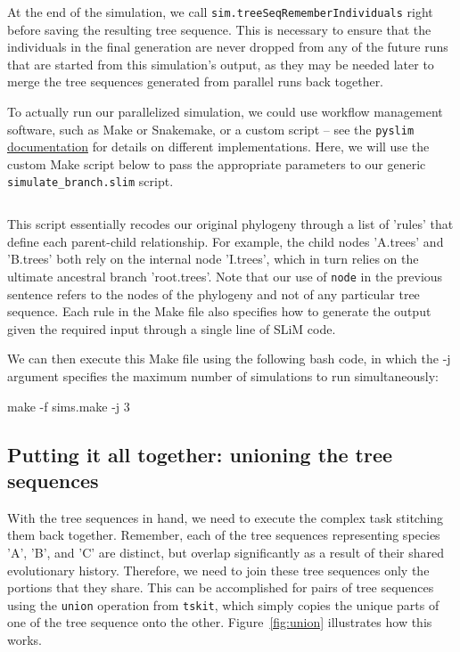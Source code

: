 \documentclass[12pt]{article}
\newcommand{\tskit}[0]{\texttt{tskit}\xspace}
\newcommand{\pyslim}[0]{\texttt{pyslim}\xspace}
\begin{document}
At the end of the simulation, we call \verb|sim.treeSeqRememberIndividuals| right before saving the resulting tree sequence.
This is necessary to ensure that the individuals in the final generation are never dropped from any of the future runs that are started from this simulation's output,
as they may be needed later to merge the tree sequences generated from parallel runs back together.

To actually run our parallelized simulation, we could use workflow management software, such as Make or Snakemake, or a custom script -- see the \pyslim
\href{https://tskit.dev/pyslim/docs/latest/vignette_parallel_phylo.html}{documentation} for details on different implementations. Here, we will use the custom Make script below to pass
the appropriate parameters to our generic \verb|simulate_branch.slim| script.

\inputminted[breaklines,fontsize=\small, breakanywhere=true, breakautoindent=true, linenos, bgcolor=gray!10]{basemake}{./code/parallelizing_phylogeny/parallel_sims.make}

This script essentially recodes our original phylogeny through a list of 'rules' that define each parent-child relationship. For example, the child nodes 'A.trees' and 'B.trees' both
rely on the internal node 'I.trees', which in turn relies on the ultimate ancestral branch 'root.trees'. Note that our use of \verb|node| in the previous sentence refers to the nodes of the
phylogeny and not of any particular tree sequence. Each rule in the Make file also specifies how to generate the output given the required input through a single line of SLiM code.

We can then execute this Make file using the following bash code, in which the -j argument specifies the maximum number of simulations to run simultaneously:

make -f sims.make -j 3

\subsection{Putting it all together: unioning the tree sequences}

With the tree sequences in hand, we need to execute the complex task stitching them back together. Remember, each of the tree sequences representing species 'A', 'B', and 'C'
are distinct, but overlap significantly as a result of their shared evolutionary history. Therefore, we need to join these tree sequences only the portions that they share. This can be
accomplished for pairs of tree sequences using the \verb|union| operation from \tskit, which simply copies the unique parts of one of the tree sequence onto the other.
Figure~\ref{fig:union} illustrates how this works.
\end{document}
